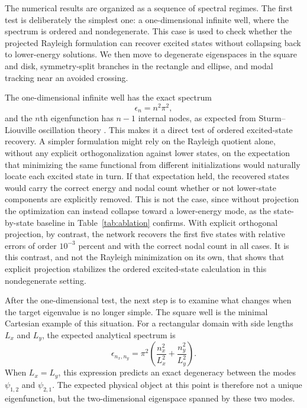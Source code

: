 \documentclass[10pt,onecolumn]{article}
\begin{document}
The numerical results are organized as a sequence of spectral regimes. The first test is deliberately the simplest one: a one-dimensional infinite well, where the spectrum is ordered and nondegenerate. This case is used to check whether the projected Rayleigh formulation can recover excited states without collapsing back to lower-energy solutions. We then move to degenerate eigenspaces in the square and disk, symmetry-split branches in the rectangle and ellipse, and modal tracking near an avoided crossing.

The one-dimensional infinite well has the exact spectrum
\begin{equation}
\epsilon_n=n^2\pi^2,
\end{equation}
and the $n$th eigenfunction has $n-1$ internal nodes, as expected from Sturm--Liouville oscillation theory \cite{Zettl2005}. This makes it a direct test of ordered excited-state recovery. A simpler formulation might rely on the Rayleigh quotient alone, without any explicit orthogonalization against lower states, on the expectation that minimizing the same functional from different initializations would naturally locate each excited state in turn. If that expectation held, the recovered states would carry the correct energy and nodal count whether or not lower-state components are explicitly removed. This is not the case, since without projection the optimization can instead collapse toward a lower-energy mode, as the state-by-state baseline in Table~\ref{tab:ablation} confirms. With explicit orthogonal projection, by contrast, the network recovers the first five states with relative errors of order $10^{-3}$ percent and with the correct nodal count in all cases. It is this contrast, and not the Rayleigh minimization on its own, that shows that explicit projection stabilizes the ordered excited-state calculation in this nondegenerate setting.

After the one-dimensional test, the next step is to examine what changes when the target eigenvalue is no longer simple. The square well is the minimal Cartesian example of this situation. For a rectangular domain with side lengths $L_x$ and $L_y$, the expected analytical spectrum is
\begin{equation}
\epsilon_{n_x,n_y}
=
\pi^2
\left(
\frac{n_x^2}{L_x^2}
+
\frac{n_y^2}{L_y^2}
\right).
\label{eq:rectangle}
\end{equation}
When $L_x=L_y$, this expression predicts an exact degeneracy between the modes $\psi_{1,2}$ and $\psi_{2,1}$. The expected physical object at this point is therefore not a unique eigenfunction, but the two-dimensional eigenspace spanned by these two modes.
\end{document}
